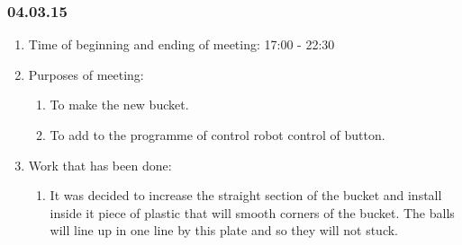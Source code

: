 \subsubsection{04.03.15}

\begin{enumerate}
	\item Time of beginning and ending of meeting:
	17:00 - 22:30
	\item Purposes of meeting:
	\begin{enumerate}
		\item To make the new bucket.
		
		\item To add to the programme of control robot control of button.
	  
    \end{enumerate}
   
	\item Work that has been done:
	\begin{enumerate}
		 
		 \item It was decided to increase the straight section of the bucket and install inside it piece of plastic that will smooth corners of the bucket. The balls will line up in one line by this plate and so they will not stuck.
		 

\end{enumerate}
\end{enumerate}
